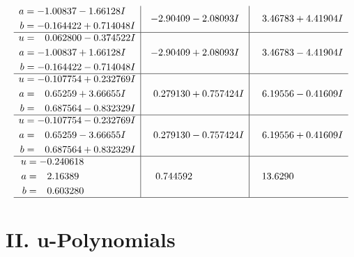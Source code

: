 \documentclass[1p]{elsarticle_modified}
\theoremstyle{definition}
\begin{document}
$$\begin{array}{c|c|c}
\begin{aligned}
a &= -1.00837 - 1.66128 I \\
b &= -0.164422 + 0.714048 I\end{aligned}
 & -2.90409 - 2.08093 I & \phantom{-}3.46783 + 4.41904 I \\ \hline\begin{aligned}
u &= \phantom{-}0.062800 - 0.374522 I \\
a &= -1.00837 + 1.66128 I \\
b &= -0.164422 - 0.714048 I\end{aligned}
 & -2.90409 + 2.08093 I & \phantom{-}3.46783 - 4.41904 I \\ \hline\begin{aligned}
u &= -0.107754 + 0.232769 I \\
a &= \phantom{-}0.65259 + 3.66655 I \\
b &= \phantom{-}0.687564 - 0.832329 I\end{aligned}
 & \phantom{-}0.279130 + 0.757424 I & \phantom{-}6.19556 - 0.41609 I \\ \hline\begin{aligned}
u &= -0.107754 - 0.232769 I \\
a &= \phantom{-}0.65259 - 3.66655 I \\
b &= \phantom{-}0.687564 + 0.832329 I\end{aligned}
 & \phantom{-}0.279130 - 0.757424 I & \phantom{-}6.19556 + 0.41609 I \\ \hline\begin{aligned}
u &= -0.240618\phantom{ +0.000000I} \\
a &= \phantom{-}2.16389\phantom{ +0.000000I} \\
b &= \phantom{-}0.603280\phantom{ +0.000000I}\end{aligned}
 & \phantom{-}0.744592\phantom{ +0.000000I} & \phantom{-}13.6290\phantom{ +0.000000I}\\
 \hline 
 \end{array}$$\newpage
\newpage\renewcommand{\arraystretch}{1}
\centering \section*{ II. u-Polynomials}
\end{document}
